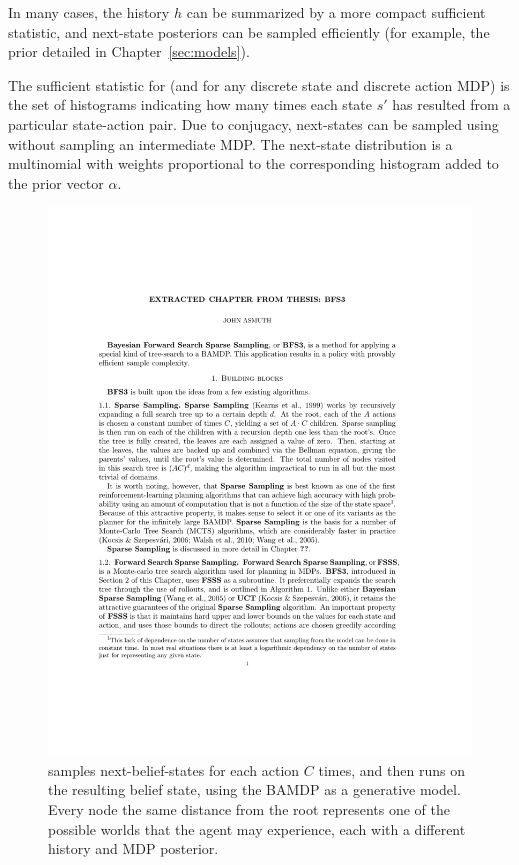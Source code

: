 In many cases, the history $h$ can be summarized by a more compact sufficient statistic, and next-state posteriors can be sampled efficiently (for example, the  prior detailed in Chapter~\ref{sec:models}).

The sufficient statistic for  (and for any discrete state and discrete action MDP) is the set of histograms indicating how many times each state $s'$ has resulted from a particular state-action pair. Due to conjugacy, next-states can be sampled using  without sampling an intermediate MDP. The next-state distribution is a multinomial with weights proportional to the corresponding histogram added to the prior vector $\alpha$.

\begin{figure}
\vskip 0.2in
\begin{center}
\centerline{\includegraphics[scale=0.5]{bfs3}}
\caption{
 samples next-belief-states for each action $C$ times, and then runs  on the resulting belief state, using the BAMDP as a generative model. Every node the same distance from the root represents one of the possible worlds that the agent may experience, each with a different history and MDP posterior.
}
\label{fig:bfs3}
\end{center}
\vskip -0.2in
\end{figure} 

